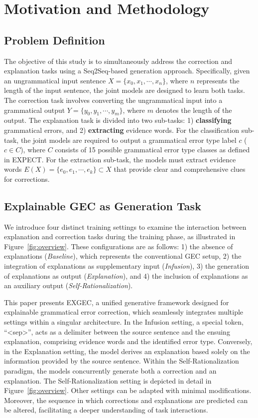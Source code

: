 \section{Motivation and Methodology}
\label{sec:method}

\subsection{Problem Definition}
\label{subsec:problem_definition}
The objective of this study is to simultaneously address the correction and explanation tasks using a Seq2Seq-based generation approach. Specifically, given an ungrammatical input sentence $X = \{x_0, x_1, \cdots, x_n\}$, where $n$ represents the length of the input sentence, the joint models are designed to learn both tasks. The correction task involves converting the ungrammatical input into a grammatical output $Y = \{y_0, y_1, \cdots, y_m\}$, where $m$ denotes the length of the output. The explanation task is divided into two sub-tasks: 1) \textbf{classifying} grammatical errors, and 2) \textbf{extracting} evidence words. For the classification sub-task, the joint models are required to output a grammatical error type label $c$ ($c \in C$), where $C$ consists of 15 possible grammatical error type classes as defined in EXPECT. For the extraction sub-task, the models must extract evidence words $E(X) = \{e_0, e_1, \cdots, e_k\} \subset X$ that provide clear and comprehensive clues for corrections.



\subsection{Explainable GEC as Generation Task}
\label{subsec:model}
We introduce four distinct training settings to examine the interaction between explanation and correction tasks during the training phase, as illustrated in Figure~\ref{fig:overview}. These configurations are as follows: 1) the absence of explanations (\textit{Baseline}), which represents the conventional GEC setup, 2) the integration of explanations as supplementary input (\textit{Infusion}), 3) the generation of explanations as output (\textit{Explanation}), and 4) the inclusion of explanations as an auxiliary output (\textit{Self-Rationalization}).

This paper presents EXGEC, a unified generative framework designed for explainable grammatical error correction, which seamlessly integrates multiple settings within a singular architecture. In the Infusion setting, a special token, ``<sep>'', acts as a delimiter between the source sentence and the ensuing explanation, comprising evidence words and the identified error type. Conversely, in the Explanation setting, the model derives an explanation based solely on the information provided by the source sentence. Within the Self-Rationalization paradigm, the models concurrently generate both a correction and an explanation. The Self-Rationalization setting is depicted in detail in Figure~\ref{fig:overview}. Other settings can be adapted with minimal modifications. Moreover, the sequence in which corrections and explanations are predicted can be altered, facilitating a deeper understanding of task interactions.


